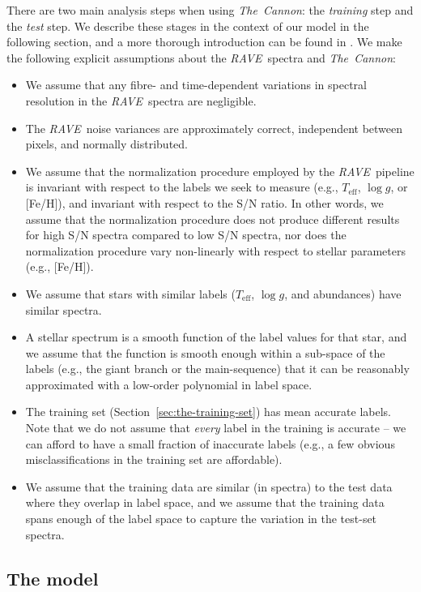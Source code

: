 \documentclass[preprint,trackchanges]{aastex}
\newcommand{\acronym}[1]{{\small{#1}}}
\newcommand{\project}[1]{\textsl{#1}}
\newcommand{\thecannon}{\project{The~Cannon}}
\newcommand{\rave}{\project{\acronym{RAVE}}}
\newcommand{\teff}{T_{\mathrm{eff}}}
\newcommand{\logg}{\log g}
\begin{document}
There are two main analysis steps when using \thecannon: the \emph{training} 
step and the \emph{test} step.  We describe these stages in the context of our
model in the following section, and a more thorough introduction can be found
in \citet{Ness_2015}.  We make the following explicit assumptions about the 
\rave\ spectra and \thecannon:

\begin{itemize}
\item We assume that any fibre- and time-dependent variations in spectral
resolution in the \rave\ spectra are negligible.
\item The \rave\ noise variances are approximately correct, independent between
pixels, and normally distributed.
\item We assume that the normalization procedure employed by the \rave\ pipeline
is invariant with respect to the labels we seek to measure (e.g., $\teff$, $\logg$,
or [Fe/H]), and invariant with respect to the S/N ratio.  In other words, we assume
that the normalization procedure does not produce different results for high S/N
spectra compared to low S/N spectra, nor does the normalization procedure vary 
non-linearly with respect to stellar parameters (e.g., [Fe/H]).
\item We assume that stars with similar labels ($\teff$, $\logg$, and abundances)
have similar spectra.
\item A stellar spectrum is a smooth function of the label values for that star,
and we assume that the function is smooth enough within a sub-space of the labels
(e.g., the giant branch or the main-sequence) that it can be reasonably approximated 
with a low-order polynomial in label space.
\item The training set (Section~\ref{sec:the-training-set}) has mean accurate labels.
Note that we do not assume that \emph{every} label in the training is accurate -- we
can afford to have a small fraction of inaccurate labels (e.g., a few obvious 
misclassifications in the training set are affordable).
\item We assume that the training data are similar (in spectra) to the test data 
where they overlap in label space, and we assume that the training data spans enough
of the label space to capture the variation in the test-set spectra.
\end{itemize}


\subsection{The model}
\label{sec:the-model}
\end{document}
